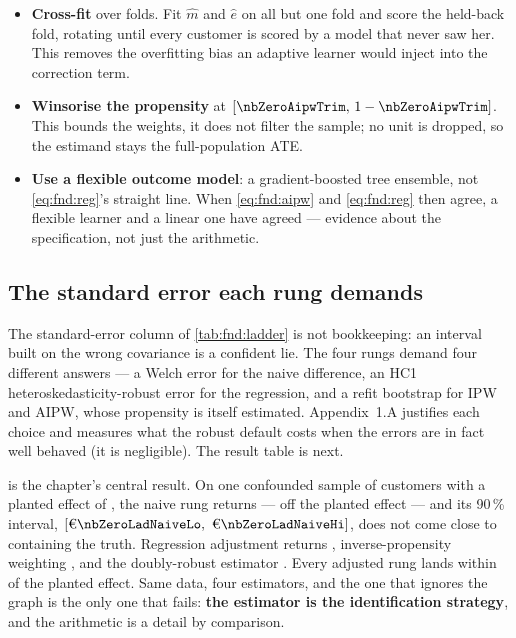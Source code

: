 \begin{itemize}[leftmargin=*, itemsep=.2em]
  \item \textbf{Cross-fit} \citep{chernozhukov2018} over \nbZeroAipwNFolds{} folds. Fit $\hat m$
        and $\hat e$ on all but one fold and score the held-back fold, rotating until every
        customer is scored by a model that never saw her. This removes the overfitting bias an
        adaptive learner would inject into the correction term.
  \item \textbf{Winsorise the propensity} at $[\nbZeroAipwTrim,\, 1 - \nbZeroAipwTrim]$. This
        bounds the weights, it does not filter the sample; no unit is dropped, so the estimand
        stays the full-population ATE.
  \item \textbf{Use a flexible outcome model}: a gradient-boosted tree ensemble, not
        \cref{eq:fnd:reg}'s straight line. When \cref{eq:fnd:aipw} and \cref{eq:fnd:reg} then
        agree, a flexible learner and a linear one have agreed --- evidence about the
        specification, not just the arithmetic.
\end{itemize}

\subsection*{The standard error each rung demands}

The standard-error column of \cref{tab:fnd:ladder} is not bookkeeping: an interval built on the
wrong covariance is a confident lie. The four rungs demand four different answers --- a Welch
error for the naive difference, an HC1 heteroskedasticity-robust error for the regression, and a
refit bootstrap for IPW and AIPW, whose propensity is itself estimated. Appendix~1.A justifies
each choice and measures what the robust default costs when the errors are in fact well behaved
(it is negligible). The result table is next.



 is the chapter's central result. On one confounded sample of
\nbZeroNCustomers{} customers with a planted effect of \eur{\nbZeroTrueDag}, the naive rung
returns \eur{\nbZeroLadNaive} --- \eur{\nbZeroLadNaiveErr} off the planted effect --- and its
90\,\% interval, $[\eur{\nbZeroLadNaiveLo},\ \eur{\nbZeroLadNaiveHi}]$, does not come close to
containing the truth. Regression adjustment returns \eur{\nbZeroLadReg}, inverse-propensity
weighting \eur{\nbZeroLadIpw}, and the doubly-robust estimator \eur{\nbZeroLadAipw}. Every
adjusted rung lands within \eur{\nbZeroLadAdjWorst} of the planted effect. Same data, four
estimators, and the one that ignores the graph is the only one that fails: \textbf{the estimator
is the identification strategy}, and the arithmetic is a detail by comparison.

